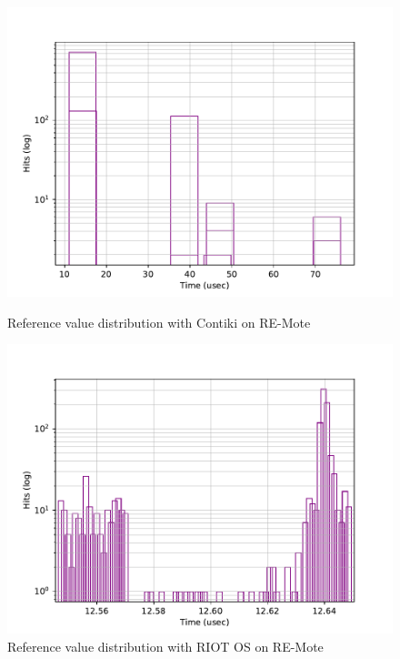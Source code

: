 \begin{figure}[!ht]
    \begin{minipage}{.45\textwidth}
        \centering
        \includegraphics[scale=.4]{assets/reference-value-contiki-remote.pdf}
        \caption{Reference value distribution with Contiki on RE-Mote\label{fig:reference-value-contiki-remote}}
    \end{minipage}\hfill
    \begin{minipage}{.45\textwidth}        
        \centering
        \includegraphics[scale=.4]{assets/reference-value-riot-remote.pdf}
        \caption{Reference value distribution with RIOT OS on RE-Mote\label{fig:reference-value-riot-remote}}
    \end{minipage}
\end{figure}


